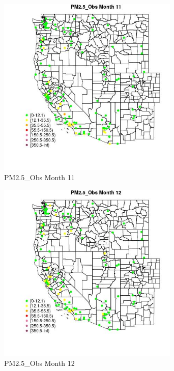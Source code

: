 \begin{figure} 
\centering  
\includegraphics[width=0.77\textwidth]{Code_Outputs/Report_ML_input_PM25_Step4_part_e_de_duplicated_aves_MapObsMo11PM25_Obs.jpg} 
\caption{\label{fig:Report_ML_input_PM25_Step4_part_e_de_duplicated_avesMapObsMo11PM25_Obs}PM2.5_Obs Month 11} 
\end{figure} 
 

\begin{figure} 
\centering  
\includegraphics[width=0.77\textwidth]{Code_Outputs/Report_ML_input_PM25_Step4_part_e_de_duplicated_aves_MapObsMo12PM25_Obs.jpg} 
\caption{\label{fig:Report_ML_input_PM25_Step4_part_e_de_duplicated_avesMapObsMo12PM25_Obs}PM2.5_Obs Month 12} 
\end{figure} 
 

